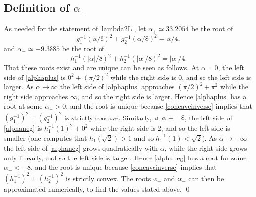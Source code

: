 \documentclass[12pt,reqno]{amsart}
\theoremstyle{definition}
\begin{document}
\subsection*{Definition of $\alpha_\pm$}
As needed for the statement of \autoref{lambda2L}, let $\alpha_+ \simeq 33.2054$ be the root of
%
\begin{equation}
g_1^{-1}(\alpha/8)^2 + g_2^{-1}(\alpha/8)^2 = \alpha/4 , \label{alphaplus} 
\end{equation}
%
and $\alpha_- \simeq -9.3885$ be the root of
%
\begin{equation}
h_1^{-1}(|\alpha|/8)^2 + h_2^{-1}(|\alpha|/8)^2 = |\alpha|/4 . \label{alphaneg}
\end{equation}
%
That these roots exist and are unique can be seen as follows. At $\alpha=0$, the left side of \eqref{alphaplus} is $0^2+(\pi/2)^2$ while the right side is $0$, and so the left side is larger. As $\alpha \to \infty$ the left side of \eqref{alphaplus} approaches $(\pi/2)^2+\pi^2$ while the right side approaches $\infty$, and so the right side is larger. Hence \eqref{alphaplus} has a root at some $\alpha_+>0$, and the root is unique because  \autoref{concaveinverse} implies that $(g_1^{-1})^2+(g_2^{-1})^2$ is strictly concave. Similarly, at $\alpha=-8$, the left side of \eqref{alphaneg} is $h_1^{-1}(1)^2+0^2$ while the right side is $2$, and so the left side is smaller (one computes that $h_1(\sqrt{2})>1$ and so $h_1^{-1}(1)<\sqrt{2})$. As $\alpha \to -\infty$ the left side of \eqref{alphaneg} grows quadratically with $\alpha$, while the right side grows only linearly, and so the left side is larger. Hence \eqref{alphaneg} has a root for some $\alpha_-<-8$, and the root is unique because  \autoref{concaveinverse} implies that $(h_1^{-1})^2+(h_2^{-1})^2$ is strictly convex. The  roots $\alpha_+$ and $\alpha_-$ can then be approximated numerically, to find the values stated above. \qed
\end{document}
